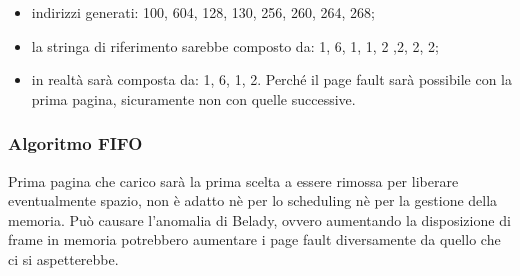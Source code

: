 \documentclass[a4paper, 12pt]{book}
\begin{document}
\begin{itemize}
    \item indirizzi generati: 100, 604, 128, 130, 256, 260, 264, 268;
    \item la stringa di riferimento sarebbe composto da: 1, 6, 1, 1, 2 ,2, 2, 2;
    \item in realtà sarà composta da: 1, 6, 1, 2. Perché il page fault sarà possibile con la prima pagina, sicuramente non con quelle successive.
\end{itemize}

\subsubsection{Algoritmo FIFO}

Prima pagina che carico sarà la prima scelta a essere rimossa per liberare  eventualmente spazio, non è adatto nè per lo scheduling 
nè per la gestione della memoria. Può causare l'anomalia di Belady, ovvero aumentando la disposizione di frame in memoria potrebbero 
aumentare i page fault diversamente da quello che ci si aspetterebbe.
\end{document}
